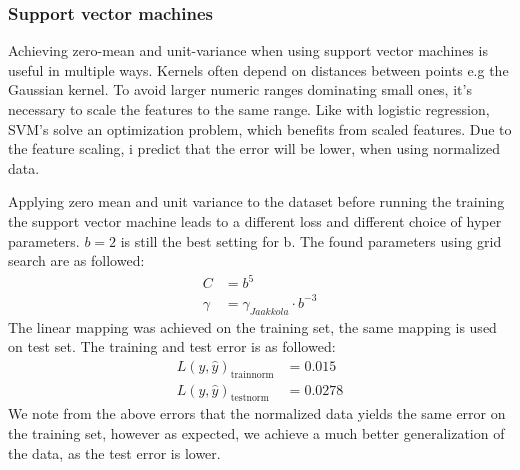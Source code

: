 \documentclass{article}
\begin{document}
\subsubsection{Support vector machines}
Achieving zero-mean and unit-variance when using support vector machines is useful in multiple ways. Kernels often depend on distances between points e.g the Gaussian kernel. To avoid larger numeric ranges dominating small ones, it's necessary to scale the features to the same range. Like with logistic regression, SVM's solve an optimization problem, which benefits from scaled features. Due to the feature scaling, i predict that the error will be lower, when using normalized data.
%

Applying zero mean and unit variance to the dataset before running the training the support vector machine leads to a different loss and different choice of hyper parameters. $b=2$ is still the best setting for b. The found parameters using grid search are as followed:
\begin{align*}
C &= b^5 \\
\gamma &= \gamma_{Jaakkola} \cdot b^{-3}
\end{align*}
The linear mapping was achieved on the training set, the same mapping is used on test set. The training and test error is as followed:
\begin{align*}
L(y,\hat{y})_{\text{trainnorm}} &= 0.015 \\
L(y,\hat{y})_{\text{testnorm}} &= 0.0278
\end{align*}
We note from the above errors that the normalized data yields the same error on the training set, however as expected, we achieve a much better generalization of the data, as the test error is lower.
\end{document}
